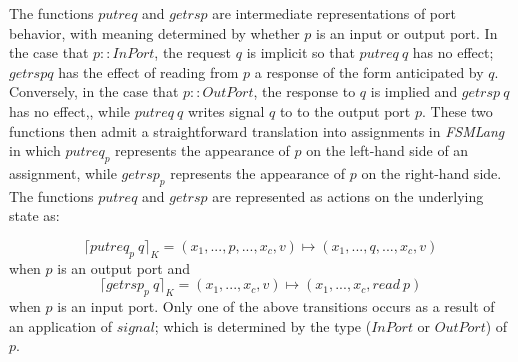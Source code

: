 \documentclass{article}
\begin{document}
The functions $putreq$ and $getrsp$ are intermediate representations of port behavior, with meaning determined by whether $p$ is an input or output port.  In the case that $p :: InPort$, the request $q$ is implicit so that $putreq \ q$ has no effect; $getrsp q$ has the effect of reading from $p$ a response of the form anticipated by $q$.  Conversely, in the case that $p :: OutPort$,  the response to $q$ is implied and $getrsp \ q$ has no effect,, while $putreq \ q$ writes signal $q$ to to the output port $p$.  These two functions then admit a straightforward translation into assignments in \textit{FSMLang} in which $putreq_{p}$ represents the appearance of $p$ on the left-hand side of an assignment, while $getrsp_{p}$ represents the appearance of $p$ on the right-hand side.\\

The functions $putreq$ and $getrsp$ are represented as actions on the underlying state as:

\begin{equation}
\lceil putreq_{p} \ q\rceil_{K} = (x_{1}, ..., p, ..., x_{c}, v) \mapsto (x_{1}, ..., q, ..., x_{c}, v)
\end{equation}
when $p$ is an output port and
\begin{equation}
\lceil getrsp_{p} \ q \rceil_{K} = (x_{1}, ..., x_{c}, v) \mapsto (x_{1}, ..., x_{c}, read \ p)
\end{equation}
when $p$ is an input port.  Only one of the above transitions occurs as a result of an application of $signal$; which is determined by the type ($InPort$ or $OutPort$) of $p$.
\end{document}

